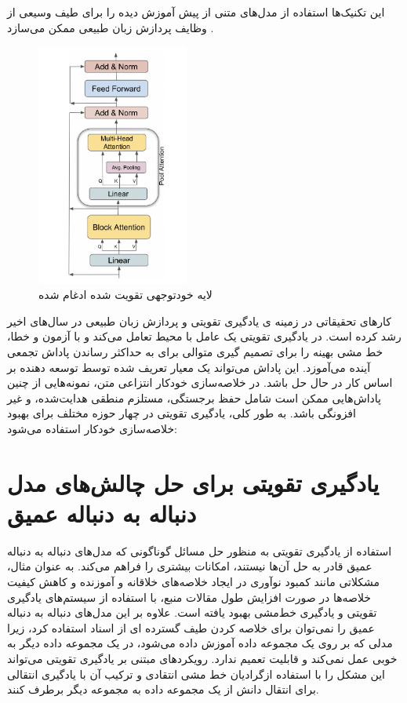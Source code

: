 این تکنیک‌ها استفاده از مدل‌های متنی از پیش آموزش دیده را برای طیف وسیعی از وظایف پردازش زبان طبیعی ممکن می‌سازد
 \cite{Xiong2022AdaptingPT}.
\begin{figure}[!h]
	\begin{center}
		\includegraphics[height=8cm]{pooling_attention.png}
	\end{center}
	\caption{ لایه خودتوجهی تقویت شده ادغام شده \cite{Xiong2022AdaptingPT}}
	\label{fig:attention_pooling}
	\medskip
	\small
\end{figure}
کارهای تحقیقاتی در زمینه ی یادگیری تقویتی
و پردازش زبان طبیعی در سال‌های اخیر رشد کرده است. در یادگیری تقویتی  یک عامل با محیط تعامل می‌کند و با آزمون و خطا، خط مشی بهینه را برای تصمیم گیری متوالی برای به حداکثر رساندن پاداش تجمعی آینده می‌آموزد. این پاداش می‌تواند یک معیار تعریف شده توسط توسعه دهنده بر اساس کار در حال حل باشد. در خلاصه‌سازی خودکار انتزاعی متن، نمونه‌هایی از چنین پاداش‌هایی ممکن است شامل حفظ برجستگی، مستلزم منطقی هدایت‌شده، و غیر افزونگی باشد. به طور کلی،  یادگیری تقویتی  در چهار حوزه مختلف برای بهبود خلاصه‌سازی خودکار استفاده می‌شود:

\section{ یادگیری تقویتی برای حل چالش‌های مدل دنباله به دنباله عمیق}

استفاده از یادگیری تقویتی به منظور حل مسائل گوناگونی که مدل‌های دنباله به دنباله عمیق قادر به حل آن‌ها نیستند، امکانات بیشتری را فراهم می‌کند. به عنوان مثال، مشکلاتی مانند کمبود نوآوری در ایجاد خلاصه‌های خلاقانه و آموزنده و کاهش کیفیت خلاصه‌ها در صورت افزایش طول مقالات منبع، با استفاده از سیستم‌های یادگیری تقویتی و یادگیری خط‌مشی بهبود یافته است.
علاوه بر این  مدل‌های دنباله به دنباله عمیق را نمی‌توان برای خلاصه کردن طیف گسترده ای از اسناد استفاده کرد، زیرا مدلی که بر روی یک مجموعه داده آموزش داده می‌شود، در یک مجموعه داده دیگر به خوبی عمل نمی‌کند و قابلیت تعمیم ندارد. رویکردهای مبتنی بر یادگیری تقویتی می‌تواند این  مشکل را با استفاده ازگرادیان خط مشی انتقادی 
و ترکیب آن با یادگیری انتقالی
برای انتقال دانش از یک مجموعه داده به مجموعه دیگر برطرف کنند\cite{DeepTL_RL}.

